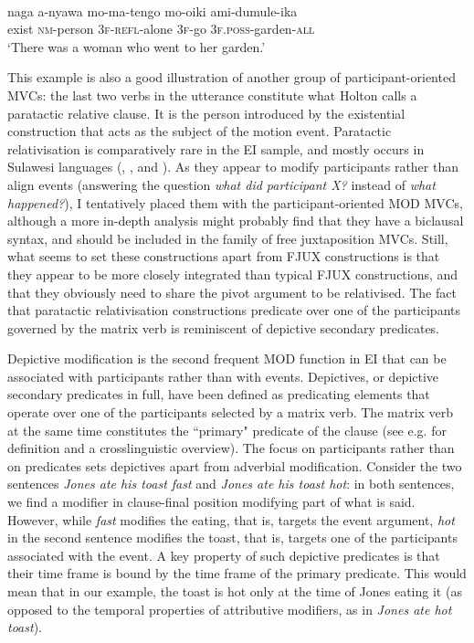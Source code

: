 \ea \label{Tobelo_29}
\\
\gll naga a-nyawa mo-ma-tengo mo-oiki ami-dumule-ika \\
exist \textsc{nm}-person 3\textsc{f}-\textsc{refl}-alone 3\textsc{f}-go 3\textsc{f}.\textsc{poss}-garden-\textsc{all} \\
\glft `There was a woman who went to her garden.'\\ 
\z

This example is also a good illustration of another group of participant-ori\-ent\-ed MVCs: the last two verbs in the utterance constitute what Holton calls a paratactic relative clause. It is the person introduced by the existential construction that acts as the subject of the motion event. Paratactic relativisation is comparatively rare in the EI sample, and mostly occurs in Sulawesi languages (, , and ). As they appear to modify participants rather than align events (answering the question \textit{what did participant X?} instead of \textit{what happened?}), I tentatively placed them with the participant-oriented MOD MVCs, although a more in-depth analysis might probably find that they have a biclausal syntax, and should be included in the family of free juxtaposition MVCs. Still, what seems to set these constructions apart from FJUX constructions is that they appear to be more closely integrated than typical FJUX constructions, and that they obviously need to share the pivot argument to be relativised. The fact that paratactic relativisation constructions predicate over one of the participants governed by the matrix verb is reminiscent of depictive secondary predicates.

Depictive modification is the second frequent MOD function in EI that can be associated with participants rather than with events. Depictives, or depictive secondary predicates in full, have been defined as predicating elements that operate over one of the participants selected by a matrix verb. The matrix verb at the same time constitutes the ``primary" predicate of the clause (see e.g. \citealt{schultze2004depictive} for definition and a crosslinguistic overview). The focus on participants rather than on predicates sets depictives apart from adverbial modification. Consider the two sentences \textit{Jones ate his toast fast} and \textit{Jones ate his toast hot}: in both sentences, we find a modifier in clause-final position modifying part of what is said. However, while \textit{fast} modifies the eating, that is, targets the event argument, \textit{hot} in the second sentence modifies the toast, that is, targets one of the participants associated with the event. A key property of such depictive predicates is that their time frame is bound by the time frame of the primary predicate. This would mean that in our example, the toast is hot only at the time of Jones eating it (as opposed to the temporal properties of attributive modifiers, as in \textit{Jones ate hot toast}).

